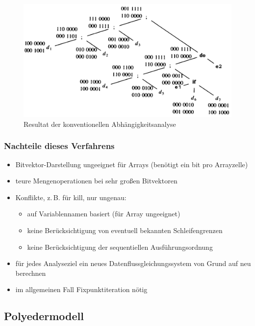 \begin{figure}[p]
  \centering
  \includegraphics[scale=0.2]{images/bild2-1.png}
  \caption{Resultat der konventionellen Abhängigkeitsanalyse}
  \label{fig:resultat}
\end{figure}

\subsubsection{Nachteile dieses Verfahrens}
\label{ssub:nachteile_dieses_verfahrens}

\begin{itemize}
  \item Bitvektor-Darstellung ungeeignet für Arrays (benötigt ein bit pro Arrayzelle)
  \item teure Mengenoperationen bei sehr großen Bitvektoren
  \item Konflikte, z.\,B. für kill, nur ungenau:
    \begin{itemize}
    \item auf Variablennamen basiert (für Array ungeeignet)
    \item keine Berücksichtigung von eventuell bekannten Schleifengrenzen
    \item keine Berücksichtigung der sequentiellen Ausführungsordnung
    \end{itemize}
  \item für jedes Analyseziel ein neues Datenflussgleichungssystem von Grund auf neu berechnen
  \item im allgemeinen Fall Fixpunktiteration nötig
\end{itemize}

\subsection{Polyedermodell}
\label{sec:polymod}

